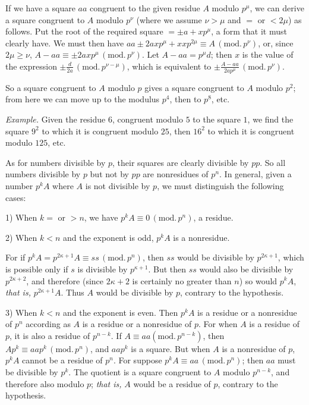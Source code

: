 If we have a square $aa$ congruent to the given residue $A$ modulo $p^\mu$, we can derive a square congruent to $A$ modulo $p^\nu$ (where we assume $\nu>\mu$ and $=$ or $<2\mu$) as follows. Put the root of the required square $=\pm a+xp^\mu$, a form that it must clearly have. We must then have $aa\pm2axp^\mu+xxp^{2\mu}\equiv A\,(\mathrm{mod.}\,p^\nu)$, or, since $2\mu\geq\nu$, $A-aa\equiv\pm2axp^\mu\,(\mathrm{mod.}\,p^\nu)$. Let $A-aa=p^{\mu}d$; then $x$ is the value of the expression $\pm\frac{d}{2a}\,(\mathrm{mod.}\,p^{\nu-\mu})$, which is equivalent to $\pm\frac{A-aa}{2ap^\mu}\,(\mathrm{mod.}\,p^\nu)$.

So a square congruent to $A$ modulo $p$ gives a square congruent to $A$ modulo $p^2$; from here we can move up to the modulus $p^4$, then to $p^8$, etc.

\emph{Example.} Given the residue $6$, congruent modulo $5$ to the square $1$, we find the square $9^2$ to which it is congruent modulo $25$, then $16^2$ to which it is congruent modulo $125$, etc.

As for numbers divisible by $p$, their squares are clearly divisible by $pp$. So all numbers divisible by $p$ but not by $pp$ are nonresidues of $p^n$. In general, given a number $p^k A$ where $A$ is not divisible by $p$, we must distinguish the following cases:

1) When $k=$ or $>n$, we have $p^k A\equiv0\,(\mathrm{mod.}\,p^n)$, a residue.

2) When $k<n$ and the exponent is odd, $p^k A$ is a nonresidue.

For if $p^k A=p^{2\kappa+1}A\equiv ss\,(\mathrm{mod.}\,p^n)$, then $ss$ would be divisible by $p^{2\kappa+1}$, which is possible only if $s$ is divisible by $p^{\kappa+1}$. But then $ss$ would also be divisible by $p^{2\kappa+2}$, and therefore (since $2\kappa+2$ is certainly no greater than $n$) so would $p^k A$, \emph{that is,} $p^{2\kappa+1}A$. Thus $A$ would be divisible by $p$, contrary to the hypothesis.

3) When $k<n$ and the exponent is even. Then $p^k A$ is a residue or a nonresidue of $p^n$ according as $A$ is a residue or a nonresidue of $p$. For when $A$ is a residue of $p$, it is also a residue of $p^{n-k}$. If $A\equiv aa (\mathrm{mod.}\,p^{n-k})$, then $Ap^k\equiv aap^k\,(\mathrm{mod.}\,p^n)$, and $aap^k$ is a square. But when $A$ is a nonresidue of $p$, $p^k A$ cannot be a residue of $p^n$. For suppose $p^k A\equiv aa\,(\mathrm{mod.}\,p^n)$; then $aa$ must be divisible by $p^k$. The quotient is a square congruent to $A$ modulo $p^{n-k}$, and therefore also modulo $p$; \emph{that is,} $A$ would be a residue of $p$, contrary to the hypothesis.

